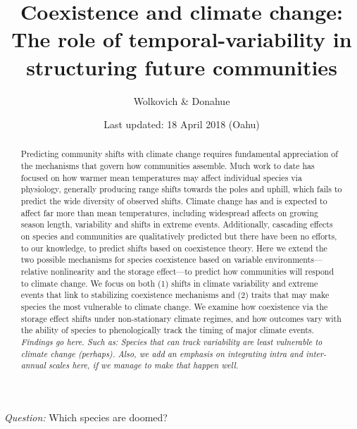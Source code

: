 \documentclass[11pt,a4paper,oneside]{article}
\begin{document}
\renewcommand{\labelitemi}{$-$}
\title{Coexistence and climate change: \\The role of
    temporal-variability in structuring future communities}
    \author{Wolkovich \& Donahue}
\date{Last updated: 18 April 2018 (Oahu) \\ } %
\maketitle 

\begin{center}
\emph{Question:} Which species are doomed?
\end{center}

\begin{abstract} Predicting community shifts
with climate change requires fundamental appreciation of the
mechanisms that govern how communities assemble. Much work to date has
focused on how warmer mean temperatures may affect individual species
via physiology, generally producing range shifts towards the poles and
uphill, which fails to predict the wide diversity of observed shifts.
Climate change has and is expected to affect far more than mean
temperatures, including widespread affects on growing season
length, variability and shifts in extreme events. Additionally,
cascading effects on species and communities are qualitatively
predicted but there have been no efforts, to our knowledge, to predict
shifts based on coexistence theory. Here we extend the two possible
mechanisms for species coexistence based on variable environments---
relative nonlinearity and the storage effect---to predict how
communities will respond to climate change. We focus on both (1) shifts in
climate variability and extreme events that link to
stabilizing coexistence mechanisms and (2) traits that may
make species the most vulnerable to climate change. We examine how
coexistence via the storage effect shifts under non-stationary climate regimes, and how outcomes vary with the
ability of species to phenologically track the timing of major climate events. \emph{Findings go here. Such as: Species that can track variability are least vulnerable to climate change (perhaps).  Also, we add an emphasis on integrating intra and inter-annual scales here, if we manage to make that happen well.}
\end{abstract}

\newpage
\tableofcontents

\newpage
\end{document}
